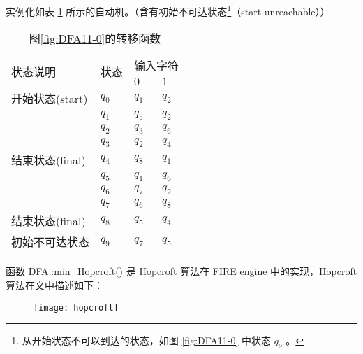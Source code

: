 实例化如表 \ref{tab:DFA411-1} 所示的自动机。（含有初始不可达状态\footnote{从开始状态不可以到达的状态，如图 \ref{fig:DFA11-0} 中状态 $q_9$ 。}（start-unreachable））

\begin{table}[!htbp]
    \caption{图\ref{fig:DFA11-0}的转移函数}
    \label{tab:DFA411-1}
    \centering
    \small%
    \setlength{\tabcolsep}{4pt}%
    \renewcommand{\arraystretch}{1.2}%
        \begin{tabular}{l p{4em}<{\centering} p{3em}<{\centering} p{3em}<{\centering}}
        \toprule %
        \multirow{2}{*}{状态说明} & \multirow{2}{*}{状态} & \multicolumn{2}{c}{输入字符} \\
		\cline{3-4}      &    &$0$ & $1$  \\
        \midrule%
        开始状态(start)  & $q_0$ & $q_1$   & $q_2$   \\
                        & $q_1$ & $q_5$   & $q_2$   \\
                        & $q_2$ & $q_3$   & $q_6$   \\
                        & $q_3$ & $q_2$   & $q_4$   \\
        结束状态(final) & $q_4$ & $q_8$   & $q_1$   \\
                        & $q_5$ & $q_1$   & $q_6$   \\
                        & $q_6$ & $q_7$   & $q_2$   \\
                        & $q_7$ & $q_6$   & $q_8$   \\
        结束状态(final) & $q_8$ & $q_5$   & $q_4$   \\
        初始不可达状态    & $q_9$ & $q_7$   & $q_5$   \\
        \bottomrule%
    \end{tabular}
\end{table}

函数 DFA::min\_Hopcroft() 是 Hopcroft 算法在 FIRE engine 中的实现，Hopcroft 算法在文中\cite{watson1993taxonomyb}描述如下：
\begin{figure}[!htbp]
    \centering
        \texttt{[image: hopcroft]}
\end{figure}

